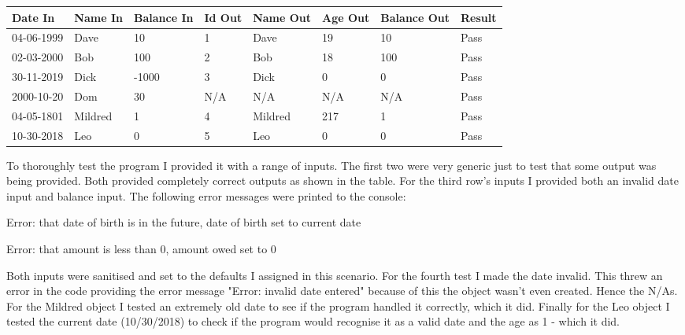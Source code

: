 \documentclass[a4paper]{article}
\begin{document}
\begin{table}[H]
\begin{tabular}{|l|l|l|l|l|l|l|l|}
\hline
\textbf{Date In} & \textbf{Name In} & \textbf{Balance In} & \textbf{Id Out} & \textbf{Name Out} & \textbf{Age Out} & \textbf{Balance Out} & \textbf{Result} \\ \hline
04-06-1999       & Dave             & 10                  & 1               & Dave              & 19               & 10                   & Pass            \\ \hline
02-03-2000       & Bob              & 100                 & 2               & Bob               & 18               & 100                  & Pass            \\ \hline
30-11-2019       & Dick             & -1000               & 3               & Dick              & 0                & 0                    & Pass            \\ \hline
2000-10-20       & Dom              & 30                  & N/A             & N/A               & N/A              & N/A                  & Pass            \\ \hline
04-05-1801       & Mildred          & 1                   & 4               & Mildred           & 217              & 1                    & Pass            \\ \hline
10-30-2018       & Leo              & 0                   & 5               & Leo               & 0                & 0                    & Pass            \\ \hline
\end{tabular}
\end{table}

To thoroughly test the program I provided it with a range of inputs. The first two were very generic just to test that some output was being provided. Both provided completely correct outputs as shown in the table. For the third row's inputs I provided both an invalid date input and balance input. The following error messages were printed to the console:

\noindent Error: that date of birth is in the future, date of birth set to current date

\noindent Error: that amount is less than 0, amount owed set to 0

Both inputs were sanitised and set to the defaults I assigned in this scenario. For the fourth test I made the date invalid. This threw an error in the code providing the error message "Error: invalid date entered" because of this the object wasn't even created. Hence the N/As. For the Mildred object I tested an extremely old date to see if the program handled it correctly, which it did. Finally for the Leo object I tested the current date (10/30/2018) to check if the program would recognise it as a valid date and the age as 1 - which it did. \newline
\end{document}
